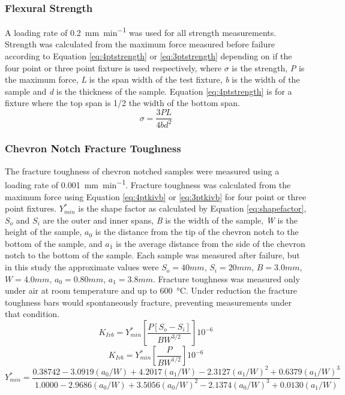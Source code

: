     \subsubsection{Flexural Strength}
        A loading rate of \SI{0.2}{mm\per\minute} was used for all strength measurements.
        Strength was calculated from the maximum force measured before failure according to Equation \ref{eq:4ptstrength} or \ref{eq:3ptstrength} depending on if the four point or three point fixture is used respectively, where $\sigma{}$ is the strength, \textit{P} is the maximum force, \textit{L} is the span width of the test fixture, \textit{b} is the width of the sample and \textit{d} is the thickness of the sample. Equation \ref{eq:4ptstrength} is for a fixture where the top span is 1/2 the width of the bottom span.\cite{ASTM2008}
        \begin{equation}
            \sigma = \frac{3PL}{4bd^{2}}
            \label{eq:4ptstrength}
        \end{equation}

    \subsubsection{Chevron Notch Fracture Toughness}
        The fracture toughness of chevron notched samples were measured using a loading rate of \SI{0.001}{mm\per\minute}.
        Fracture toughness was calculated from the maximum force using Equation \ref{eq:4ptkivb} or \ref{eq:3ptkivb} for four point or three point fixtures.\cite{ASTM2016a,Wu1984}
        $Y^{*}_{min}$ is the shape factor as calculated by Equation \ref{eq:shapefactor}, $S_o$ and $S_i$ are the outer and inner spans, \textit{B} is the width of the sample, \textit{W} is the height of the sample, $a_0$ is the distance from the tip of the chevron notch to the bottom of the sample, and $a_1$ is the average distance from the side of the chevron notch to the bottom of the sample.
        Each sample was measured after failure, but in this study the approximate values were $S_o = 40 mm$, $S_i = 20 mm$, $B = 3.0 mm$, $W = 4.0 mm$, $a_0 = 0.80 mm$, $a_1 = 3.8 mm$.
        Fracture toughness was measured only under air at room temperature and up to \SI{600}{\celsius}.
        Under reduction the fracture toughness bars would spontaneously fracture, preventing measurements under that condition.
        \begin{equation}
            K_{Ivb} = Y^{*}_{min}  \left [\frac{P[S_o-S_i]}{BW^{3/2}}\right ]10^{-6}
            \label{eq:4ptkivb}
        \end{equation}
        \begin{equation}
            K_{Ivb} = Y^{*}_{min}  \left [\frac{P}{BW^{1/2}}\right ]10^{-6}
            \label{eq:3ptkivb}
        \end{equation}
        \begin{equation}
            Y^{*}_{min} = \frac{0.38742-3.0919(a_0/W)+4.2017(a_1/W)-2.3127(a_1/W)^2+0.6379(a_1/W)^3}{1.0000-2.9686(a_0/W)+3.5056(a_0/W)^2-2.1374(a_0/W)^3+0.0130(a_1/W)}
            \label{eq:shapefactor}
        \end{equation}

